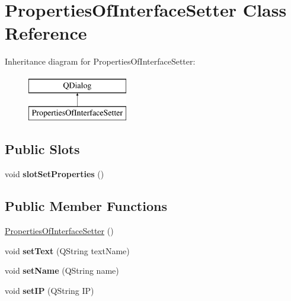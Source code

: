 \hypertarget{class_properties_of_interface_setter}{\section{Properties\-Of\-Interface\-Setter Class Reference}
\label{class_properties_of_interface_setter}
}
Inheritance diagram for Properties\-Of\-Interface\-Setter\-:\begin{figure}[H]
\begin{center}
\leavevmode
\includegraphics[height=2.000000cm]{class_properties_of_interface_setter}
\end{center}
\end{figure}
\subsection*{Public Slots}
\begin{DoxyCompactItemize}
\item 
\hypertarget{class_properties_of_interface_setter_a2f766a447a95301cb2383bd7f04ee868}{void {\bfseries slot\-Set\-Properties} ()}\label{class_properties_of_interface_setter_a2f766a447a95301cb2383bd7f04ee868}

\end{DoxyCompactItemize}
\subsection*{Public Member Functions}
\begin{DoxyCompactItemize}
\item 
\hyperlink{class_properties_of_interface_setter_adda8551a0ecbfb6e320755a5213c5d15}{Properties\-Of\-Interface\-Setter} ()
\item 
\hypertarget{class_properties_of_interface_setter_ad8a6e8777b161e41fcd04cc38484d8e5}{void {\bfseries set\-Text} (Q\-String text\-Name)}\label{class_properties_of_interface_setter_ad8a6e8777b161e41fcd04cc38484d8e5}

\item 
\hypertarget{class_properties_of_interface_setter_ab6939304907c5fc8d4c587cf3b428400}{void {\bfseries set\-Name} (Q\-String name)}\label{class_properties_of_interface_setter_ab6939304907c5fc8d4c587cf3b428400}

\item 
\hypertarget{class_properties_of_interface_setter_ae6e228634e4e11751ffa84a39b02cbe9}{void {\bfseries set\-I\-P} (Q\-String I\-P)}\label{class_properties_of_interface_setter_ae6e228634e4e11751ffa84a39b02cbe9}

\end{DoxyCompactItemize}

